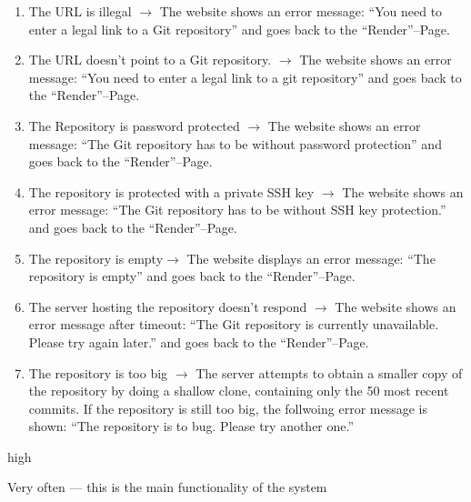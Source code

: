 \documentclass[11pt]{scrartcl}
\begin{document}
\begin{description}[leftmargin=!,labelwidth=\widthof{\bfseries Goal in context:}]
\item[Exceptions:]
\begin{enumerate}
\item The URL is illegal $\rightarrow$ The website shows an error message:
	\enquote{You need to enter a legal link to a Git repository} and goes
	back to the \enquote{Render}--Page.
\item The URL doesn't point to a Git repository. $\rightarrow$  The website
	shows an error message: \enquote{You need to enter a legal link to a git
	repository} and goes back to the \enquote{Render}--Page.
\item The Repository is password protected $\rightarrow$ The website shows an
	error message: \enquote{The Git repository has to be without password
	protection} and goes back to the \enquote{Render}--Page.
\item The repository is protected with a private SSH key $\rightarrow$ The
	website shows an error message: \enquote{The Git repository has to be
	without SSH key protection.} and goes back to the
	\enquote{Render}--Page.
\item The repository is empty$\rightarrow$ The website displays an error
	message: \enquote{The repository is empty} and goes back to the
	\enquote{Render}--Page.
\item The server hosting the repository doesn't respond $\rightarrow$ The
	website shows an error message after timeout: \enquote{The Git
	repository is currently unavailable. Please try again later.} and goes
	back to the \enquote{Render}--Page. 
\item The repository is too big $\rightarrow$  The server attempts to obtain a
	smaller copy of the repository by doing a shallow clone, containing only
	the 50 most recent commits. If the repository is still too big, the
	follwoing error message is shown: \enquote{The repository is to bug. Please try another one.}
\end{enumerate}

\item[Priority:] high
\item[Frequency of use:] Very often --- this is the main functionality of the system

\end{description}
\end{document}
